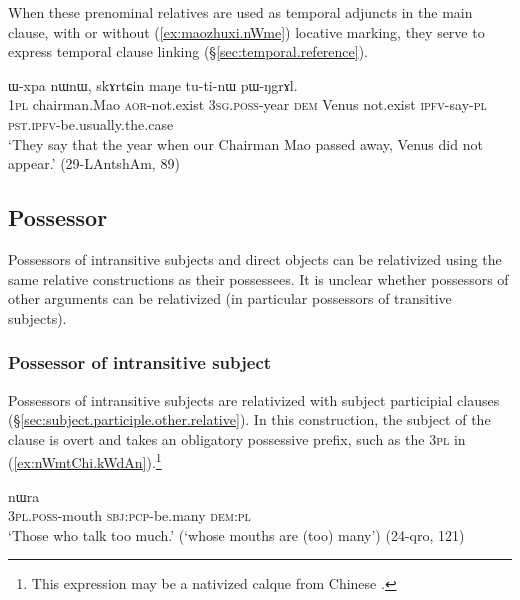 When these prenominal relatives are used as temporal adjuncts in the main clause, with or without (\ref{ex:maozhuxi.nWme}) locative marking, they serve to express temporal clause linking (§\ref{sec:temporal.reference}).

\begin{exe}
\ex \label{ex:maozhuxi.nWme}
 ɯ-xpa nɯnɯ, skɤrtɕin maŋe tu-ti-nɯ pɯ-ŋgrɤl. \\
\textsc{1pl} chairman.Mao \textsc{aor}-not.exist \textsc{3sg}.\textsc{poss}-year \textsc{dem} Venus not.exist \textsc{ipfv}-say-\textsc{pl} \textsc{pst}.\textsc{ipfv}-be.usually.the.case \\
\glt `They say that the year when our Chairman Mao passed away, Venus did not appear.' (29-LAntshAm, 89)
\end{exe}
 

\subsection{Possessor} \label{sec:possessor.relativization}
Possessors of intransitive subjects and direct objects can be relativized using the same relative constructions as their possessees. It is unclear whether possessors of other arguments can be relativized (in particular possessors of transitive subjects).

\subsubsection{Possessor of intransitive subject}  \label{sec:S.possessor.relativization}
Possessors of intransitive subjects are relativized with subject participial clauses (§\ref{sec:subject.participle.other.relative}). In this construction, the subject of the clause is overt and takes an obligatory possessive prefix, such as the \textsc{3pl}  in (\ref{ex:nWmtChi.kWdAn}).\footnote{This expression may be a nativized calque from Chinese . }

\begin{exe}
\ex \label{ex:nWmtChi.kWdAn}
 nɯra \\
\textsc{3pl}.\textsc{poss}-mouth \textsc{sbj}:\textsc{pcp}-be.many \textsc{dem}:\textsc{pl} \\
\glt `Those who talk too much.' (`whose mouths are (too) many') (24-qro, 121)
\end{exe}

